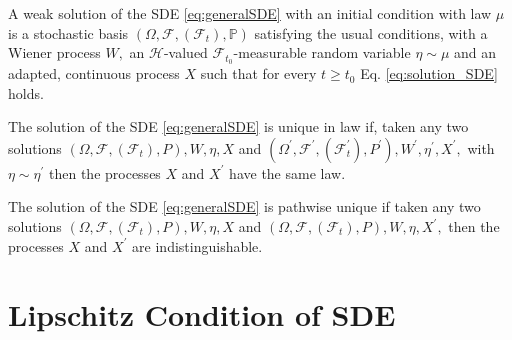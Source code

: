 \begin{definition}\label{def:weak_solution_SDE}
	A weak solution of the SDE \eqref{eq:generalSDE} with an initial condition with law $\mu$ is a stochastic basis $\left(\Omega, \mathcal{F},\left(\mathcal{F}_{t}\right), \mathbb{P}\right)$ satisfying the usual conditions, with a Wiener process $W,$ an $\mathcal{H}$-valued $\mathcal{F}_{t_{0}}$-measurable random variable $\eta \sim \mu$ and an adapted, continuous process $X$ such that for every $t \geq t_{0} $ Eq. \eqref{eq:solution_SDE} holds.
\end{definition}


\begin{definition}
	The solution of the SDE \eqref{eq:generalSDE} is unique in law if, taken any two solutions $\left(\Omega, \mathcal{F},\left(\mathcal{F}_{t}\right), P\right), W, \eta, X$ and $\left(\Omega^{\prime}, \mathcal{F}^{\prime},\left(\mathcal{F}_{t}^{\prime}\right), P^{\prime}\right), W^{\prime}, \eta^{\prime}, X^{\prime},$ with $\eta \sim \eta^{\prime}$ then the processes $X$ and $X^{\prime}$ have the same law.
\end{definition}

\begin{definition}
	The solution of the SDE \eqref{eq:generalSDE} is pathwise unique if taken any two solutions $\left(\Omega, \mathcal{F},\left(\mathcal{F}_{t}\right), P\right), W, \eta, X$ and $\left(\Omega, \mathcal{F},\left(\mathcal{F}_{t}\right), P\right), W, \eta, X^{\prime},$ then the processes $X$ and $X^{\prime}$ are indistinguishable.
\end{definition}

\section{Lipschitz Condition of SDE}

